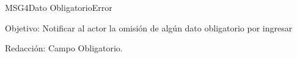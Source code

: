 \begin{mensaje}{MSG4}{Dato Obligatorio}{Error}
	\item [Objetivo:] Notificar al actor la omisión de algún dato obligatorio por ingresar
	\item[Redacción:] Campo Obligatorio.
\end{mensaje}